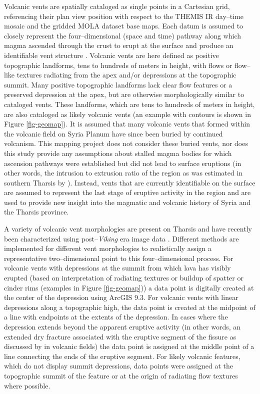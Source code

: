 \documentclass[preprint,review,authoryear,12pt]{elsarticle}
\begin{document}
Volcanic vents are spatially cataloged as single points in a Cartesian grid, referencing their plan view position with respect to the THEMIS IR day--time mosaic and the gridded MOLA dataset base maps. Each datum is assumed to closely represent the four--dimensional (space and time) pathway along which magma ascended through the crust to erupt at the surface and produce an identifiable vent structure \citep{Bishop2007}. Volcanic vents are here defined as positive topographic landforms, tens to hundreds of meters in height, with flows or flow--like textures radiating from the apex and/or depressions at the topographic summit. Many positive topographic landforms lack clear flow features or a preserved depression at the apex, but are otherwise morphologically similar to cataloged vents. These landforms, which are tens to hundreds of meters in height, are also cataloged as likely volcanic vents (an example with contours is shown in Figure \ref{fig-geomap}). It is assumed that many volcanic vents that formed within the volcanic field on Syria Planum have since been buried by continued volcanism. This mapping project does not consider these buried vents, nor does this study provide any assumptions about stalled magma bodies for which ascension pathways were established but did not lead to surface eruptions (in other words, the intrusion to extrusion ratio of the region as was estimated in southern Tharsis by \citet{Lillis2009}). Instead, vents that are currently identifiable on the surface are assumed to represent the last stage of eruptive activity in the region and are used to provide new insight into the magmatic and volcanic history of Syria and the Tharsis province.

A variety of volcanic vent morphologies are present on Tharsis and have recently been characterized using post--\textit{Viking} era image data \citep{Bleacher2007,Bleacher2009,Broz2012,Keszthelyi2008,Baptista2008,Hauber2009,Wilson2009,Baratoux2009}. Different methods are implemented for different vent morphologies to realistically assign a representative two--dimensional point to this four--dimensional process. For volcanic vents with depressions at the summit from which lava has visibly erupted (based on interpretation of radiating textures or buildup of spatter or cinder rims (examples in Figure \ref{fig-geomap})) a data point is digitally created  at the center of the depression using ArcGIS 9.3. For volcanic vents with linear depressions along a topographic high, the data point is created at the midpoint of a line with endpoints at the extents of the depression. In cases where the depression extends beyond the apparent eruptive activity (in other words, an extended dry fracture associated with the eruptive segment of the fissure as discussed by \citet{Greeley1977} in volcanic fields) the data point is assigned at the middle point of a line connecting the ends of the eruptive segment. For likely volcanic features, which do not display summit depressions, data points were assigned at the topographic summit of the feature or at the origin of radiating flow textures where possible.
\end{document}
